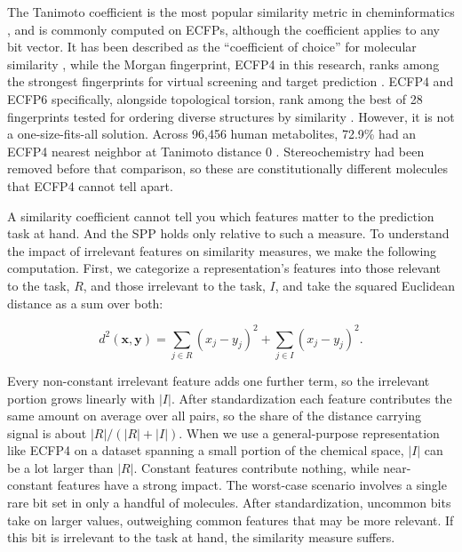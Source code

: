 The Tanimoto coefficient is the most popular similarity metric in cheminformatics \citep{LopezPerez2024}, and is commonly computed on ECFPs, although the coefficient applies to any bit vector. It has been described as the ``coefficient of choice'' for molecular similarity \citep{Willett2006}, while the Morgan fingerprint, ECFP4 in this research, ranks among the strongest fingerprints for virtual screening and target prediction \citep{Capecchi2020}. ECFP4 and ECFP6 specifically, alongside topological torsion, rank among the best of 28 fingerprints tested for ordering diverse structures by similarity \citep{OBoyle2016}. However, it is not a one-size-fits-all solution. Across 96,456 human metabolites, 72.9\% had an ECFP4 nearest neighbor at Tanimoto distance 0 \citep{Capecchi2020}. Stereochemistry had been removed before that comparison, so these are constitutionally different molecules that ECFP4 cannot tell apart. 


A similarity coefficient cannot tell you which features matter to the prediction task at hand. And the SPP holds only relative to such a measure. To understand the impact of irrelevant features on similarity measures, we make the following computation. First, we categorize a representation's features into those relevant to the task, $R$, and those irrelevant to the task, $I$, and take the squared Euclidean distance as a sum over both:

\begin{equation}
d^2(\mathbf{x},\mathbf{y}) = \sum_{j \in R}(x_j-y_j)^2 + \sum_{j \in I}(x_j-y_j)^2 .
\label{eq:distance_split}
\end{equation}

Every non-constant irrelevant feature adds one further term, so the irrelevant portion grows linearly with $|I|$. After standardization each feature contributes the same amount on average over all pairs, so the share of the distance carrying signal is about $|R|/(|R|+|I|)$. When we use a general-purpose representation like ECFP4 on a dataset spanning a small portion of the chemical space, $|I|$ can be a lot larger than $|R|$. Constant features contribute nothing, while near-constant features have a strong impact. The worst-case scenario involves a single rare bit set in only a handful of molecules. After standardization, uncommon bits take on larger values, outweighing common features that may be more relevant. If this bit is irrelevant to the task at hand, the similarity measure suffers. 

